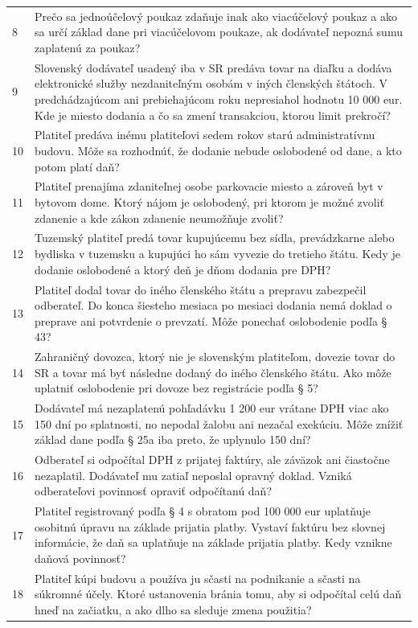 \begin{longtable}{p{}p{}}
8 & Prečo sa jednoúčelový poukaz zdaňuje inak ako viacúčelový poukaz a ako sa určí základ dane pri viacúčelovom poukaze, ak dodávateľ nepozná sumu zaplatenú za poukaz? \\
9 & Slovenský dodávateľ usadený iba v SR predáva tovar na diaľku a dodáva elektronické služby nezdaniteľným osobám v iných členských štátoch. V predchádzajúcom ani prebiehajúcom roku nepresiahol hodnotu 10 000 eur. Kde je miesto dodania a čo sa zmení transakciou, ktorou limit prekročí? \\
10 & Platiteľ predáva inému platiteľovi sedem rokov starú administratívnu budovu. Môže sa rozhodnúť, že dodanie nebude oslobodené od dane, a kto potom platí daň? \\
11 & Platiteľ prenajíma zdaniteľnej osobe parkovacie miesto a zároveň byt v bytovom dome. Ktorý nájom je oslobodený, pri ktorom je možné zvoliť zdanenie a kde zákon zdanenie neumožňuje zvoliť? \\
12 & Tuzemský platiteľ predá tovar kupujúcemu bez sídla, prevádzkarne alebo bydliska v tuzemsku a kupujúci ho sám vyvezie do tretieho štátu. Kedy je dodanie oslobodené a ktorý deň je dňom dodania pre DPH? \\
13 & Platiteľ dodal tovar do iného členského štátu a prepravu zabezpečil odberateľ. Do konca šiesteho mesiaca po mesiaci dodania nemá doklad o preprave ani potvrdenie o prevzatí. Môže ponechať oslobodenie podľa § 43? \\
14 & Zahraničný dovozca, ktorý nie je slovenským platiteľom, dovezie tovar do SR a tovar má byť následne dodaný do iného členského štátu. Ako môže uplatniť oslobodenie pri dovoze bez registrácie podľa § 5? \\
15 & Dodávateľ má nezaplatenú pohľadávku 1 200 eur vrátane DPH viac ako 150 dní po splatnosti, no nepodal žalobu ani nezačal exekúciu. Môže znížiť základ dane podľa § 25a iba preto, že uplynulo 150 dní? \\
16 & Odberateľ si odpočítal DPH z prijatej faktúry, ale záväzok ani čiastočne nezaplatil. Dodávateľ mu zatiaľ neposlal opravný doklad. Vzniká odberateľovi povinnosť opraviť odpočítanú daň? \\
17 & Platiteľ registrovaný podľa § 4 s obratom pod 100 000 eur uplatňuje osobitnú úpravu na základe prijatia platby. Vystaví faktúru bez slovnej informácie, že daň sa uplatňuje na základe prijatia platby. Kedy vznikne daňová povinnosť? \\
18 & Platiteľ kúpi budovu a používa ju sčasti na podnikanie a sčasti na súkromné účely. Ktoré ustanovenia bránia tomu, aby si odpočítal celú daň hneď na začiatku, a ako dlho sa sleduje zmena použitia? \\

\end{longtable}
